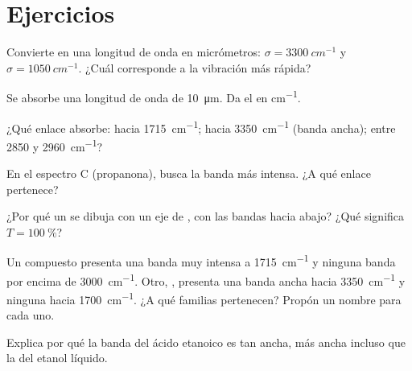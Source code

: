 \section{Ejercicios}

\begin{exercise}[$\star$]\label{exo:g11:infrared:1}
Convierte en una longitud de onda en micrómetros:
$\sigma = \qty{3300}{cm^{-1}}$ y $\sigma = \qty{1050}{cm^{-1}}$. ¿Cuál
corresponde a la vibración más rápida?
\end{exercise}

\begin{exercise}[$\star$]\label{exo:g11:infrared:2}
Se absorbe una longitud de onda de \qty{10}{\micro m}. Da el  en \si{cm^{-1}}.
\end{exercise}

\begin{exercise}[$\star$]\label{exo:g11:infrared:3}
¿Qué enlace absorbe: hacia \qty{1715}{cm^{-1}}; hacia
\qty{3350}{cm^{-1}} (banda ancha); entre 2850 y \qty{2960}{cm^{-1}}?
\end{exercise}

\begin{exercise}[$\star$]\label{exo:g11:infrared:4}
En el espectro C (propanona), busca la banda más intensa. ¿A qué enlace
pertenece?
\end{exercise}

\begin{exercise}[$\star$]\label{exo:g11:infrared:5}
¿Por qué un  se dibuja con un eje de ,
con las bandas hacia abajo? ¿Qué significa $T = \qty{100}{\percent}$?
\end{exercise}

\begin{exercise}[$\star\star$]\label{exo:g11:infrared:6}
Un compuesto  presenta una banda muy intensa a
\qty{1715}{cm^{-1}} y ninguna banda por encima de \qty{3000}{cm^{-1}}.
Otro, , presenta una banda ancha hacia \qty{3350}{cm^{-1}} y
ninguna hacia \qty{1700}{cm^{-1}}. ¿A qué familias pertenecen? Propón un
nombre para cada uno.
\end{exercise}

\begin{exercise}[$\star\star$]\label{exo:g11:infrared:7}
Explica por qué la banda  del ácido etanoico es tan ancha, más
ancha incluso que la del etanol líquido.
\end{exercise}

